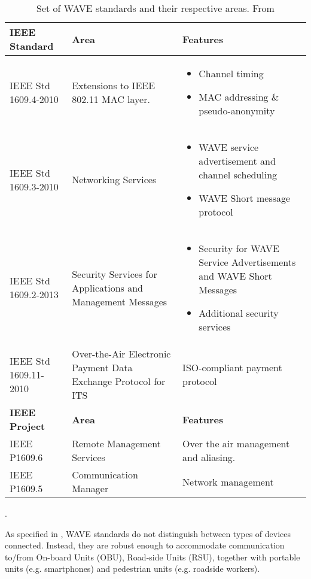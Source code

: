 \begin{sidewaystable}
    \centering
    \begin{tabular}{|p{5cm}|p{5cm}|p{9cm}|}
        \hline
         \textbf{IEEE Standard} & \textbf{Area} & \textbf{Features} \\
         \hline
         IEEE Std 1609.4-2010 & Extensions to IEEE 802.11 MAC layer. & 
         \begin{itemize}[nolistsep,noitemsep, topsep=0pt]
             \item Channel timing
             \item MAC addressing \& pseudo-anonymity
         \end{itemize} \\ \hline
         IEEE Std 1609.3-2010 & Networking Services & 
         \begin{itemize}[nolistsep,noitemsep, topsep=0pt]
             \item WAVE service advertisement and channel scheduling
             \item WAVE Short message protocol
         \end{itemize} \\ \hline
         IEEE Std 1609.2-2013 & Security Services for Applications and Management Messages &
         \begin{itemize}[nolistsep,noitemsep, topsep=0pt]
             \item Security for WAVE Service Advertisements and WAVE Short Messages
             \item Additional security services
         \end{itemize} \\ \hline
        IEEE Std 1609.11-2010 & Over-the-Air Electronic Payment Data Exchange Protocol for ITS & ISO-compliant payment protocol \\ \hline \hline
        \textbf{IEEE Project} & \textbf{Area} & \textbf{Features} \\ \hline
        IEEE P1609.6  & Remote Management Services & Over the air management and aliasing. \\ \hline
        IEEE P1609.5  & Communication Manager & Network management \\ \hline
    \end{tabular}
    \caption{Set of WAVE standards and their respective areas. From \cite{VehicularTechnologySociety2014IEEEArchitecture}}.
    \label{tab:wave-stds}
\end{sidewaystable}
% 
As specified in \cite{VehicularTechnologySociety2014IEEEArchitecture}, WAVE standards do not distinguish between types of devices connected. Instead, they are robust enough to accommodate communication to/from On-board Units (OBU), Road-side Units (RSU), together with portable units (e.g. smartphones) and pedestrian units (e.g. roadside workers). 
% 
